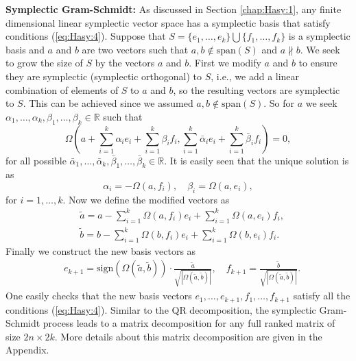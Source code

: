 {\bf Symplectic Gram-Schmidt:} As discussed in Section \ref{chap:Hasy:1}, any finite dimensional linear symplectic vector space has a symplectic basis that satisfy conditions (\ref{eq:Hasy:4}). Suppose that $S=\{ e_1 , \dots , e_k \} \bigcup \{ f_1 , \dots , f_k \}$ is a symplectic basis and $a$ and $b$ are two vectors such that $a,b \not \in \text{span}(S)$ and $a \nparallel b$. We seek to grow the size of $S$ by the vectors $a$ and $b$. First we modify $a$ and $b$ to ensure they are symplectic (symplectic orthogonal) to $S$, i.e., we add a linear combination of elements of $S$ to $a$ and $b$, so the resulting vectors are symplectic to $S$. This can be achieved since we assumed $a,b\not \in \text{span}(S)$. So for $a$ we seek $\alpha_1,\dots,\alpha_k,\beta_1,\dots,\beta_k \in \mathbb R$ such that
\begin{equation}
	\Omega\left(a + \sum_{i=1}^k \alpha_i e_i + \sum_{i=1}^k \beta_i f_i , \sum_{i=1}^k \bar{\alpha}_i e_i + \sum_{i=1}^k \bar{\beta}_i f_i \right) = 0,
\end{equation}
for all possible $\bar{\alpha}_1,\dots,\bar{\alpha}_k,\bar{\beta}_1,\dots,\bar{\beta}_k \in \mathbb R$. It is easily seen that the unique solution is as 
\begin{equation}
	\alpha_i = - \Omega(a,f_i), \quad \beta_i = \Omega(a,e_i),
\end{equation}
for $i=1,\dots,k$. Now we define the modified vectors as
\begin{equation}
\begin{aligned}
	& \tilde a = a - \sum_{i=1}^k \Omega(a,f_i) e_i + \sum_{i=1}^k \Omega(a,e_i) f_i, \\
	& \tilde b = b - \sum_{i=1}^k \Omega(b,f_i) e_i + \sum_{i=1}^k \Omega(b,e_i) f_i.
\end{aligned}
\end{equation}
Finally we construct the new basis vectors as
\begin{equation}
\begin{aligned}
	& e_{k+1} = \text{sign}(\Omega(\tilde a , \tilde b)) \cdot \frac{\tilde a}{ \sqrt{ |\Omega(\tilde a , \tilde b)| } }, \quad f_{k+1} = \frac{\tilde b}{ \sqrt{ |\Omega(\tilde a , \tilde b)| } }.
\end{aligned}
\end{equation}
One easily checks that the new basis vectors $e_1,\dots,e_{k+1},f_1,\dots,f_{k+1}$ satisfy all the conditions (\ref{eq:Hasy:4}). Similar to the QR decomposition, the symplectic Gram-Schmidt process leads to a matrix decomposition for any full ranked matrix of size $2n\times 2k$. More details about this matrix decomposition are given in the Appendix.

